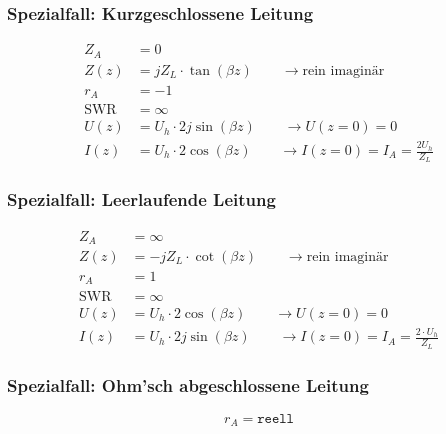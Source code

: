 \subsubsection{Spezialfall: Kurzgeschlossene Leitung}
\begin{align*}
    Z_A          & = 0                                                                        \\
    Z(z)         & = j Z_L\cdot\tan(\beta z)        \qquad\rightarrow\text{rein imaginär}     \\
    r_A          & = -1                                                                       \\
    \mathrm{SWR} & = \infty                                                                   \\
    U(z)         & = U_h\cdot 2j\sin(\beta z)    \qquad\rightarrow U(z=0)=0                   \\
    I(z)         & = U_h\cdot 2\cos(\beta z)    \qquad\rightarrow I(z=0)=I_A=\frac{2U_h}{Z_L}
\end{align*}

\subsubsection{Spezialfall: Leerlaufende Leitung}
\begin{align*}
    Z_A          & = \infty                                                                         \\
    Z(z)         & = -jZ_L\cdot \cot(\beta z) \qquad\rightarrow\text{rein imaginär}                 \\
    r_A          & = 1                                                                              \\
    \mathrm{SWR} & = \infty                                                                         \\
    U(z)         & = U_h\cdot 2\cos(\beta z) \qquad\rightarrow U(z=0)=0                             \\
    I(z)         & = U_h\cdot 2j\sin(\beta z) \qquad\rightarrow I(z=0)=I_A = \frac{2\cdot U_h}{Z_L}
\end{align*}

\subsubsection{Spezialfall: Ohm'sch abgeschlossene Leitung}
\[
    r_A = \texttt{reell}
\]

